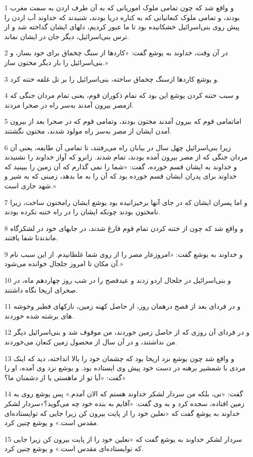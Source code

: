 \par 1 و واقع شد که چون تمامی ملوک اموریانی که به آن طرف اردن به سمت مغرب بودند، و تمامی ملوک کنعانیانی که به کناره دریا بودند، شنیدند که خداوند آب اردن را پیش روی بنی‌اسرائیل خشکانیده بود تا ما عبور کردیم، دلهای ایشان گداخته شد و از ترس بنی‌اسرائیل، دیگر جان در ایشان نماند.
\par 2 در آن وقت، خداوند به یوشع گفت: «کاردها از سنگ چخماق برای خود بساز، و بنی‌اسرائیل را بار دیگر مختون ساز.»
\par 3 و یوشع کاردها ازسنگ چخماق ساخته، بنی‌اسرائیل را بر تل غلفه ختنه کرد.
\par 4 و سبب ختنه کردن یوشع این بود که تمام ذکوران قوم، یعنی تمام مردان جنگی که ازمصر بیرون آمدند به‌سر راه در صحرا مردند.
\par 5 اماتمامی قوم که بیرون آمدند مختون بودند، وتمامی قوم که در صحرا بعد از بیرون آمدن ایشان از مصر به‌سر راه مولود شدند، مختون نگشتند.
\par 6 زیرا بنی‌اسرائیل چهل سال در بیابان راه می‌رفتند، تا تمامی آن طایفه، یعنی آن مردان جنگی که از مصر بیرون آمده بودند، تمام شدند. زانرو که آواز خداوند را نشنیدند و خداوند به ایشان قسم خورده، گفت: «شما را نمی گذارم که آن زمین را ببینید که خداوند برای پدران ایشان قسم خورده بود که آن را به ما بدهد، زمینی که به شیر و شهد جاری است.»
\par 7 و اما پسران ایشان که در جای آنها برخیزانیده بود یوشع ایشان رامختون ساخت، زیرا نامختون بودند چونکه ایشان را در راه ختنه نکرده بودند.
\par 8 و واقع شد که چون از ختنه کردن تمام قوم فارغ شدند، در جایهای خود در لشکرگاه ماندندتا شفا یافتند.
\par 9 و خداوند به یوشع گفت: «امروزعار مصر را از روی شما غلطانیدم. از این سبب نام آن مکان تا امروز جلجال خوانده می‌شود.»
\par 10 و بنی‌اسرائیل در جلجال اردو زدند و عیدفصح را در شب روز چهاردهم ماه، در صحرای اریحا نگاه داشتند.
\par 11 و در فردای بعد از فصح درهمان روز، از حاصل کهنه زمین، نازکهای فطیر وخوشه های برشته شده خوردند.
\par 12 و در فردای آن روزی که از حاصل زمین خوردند، من موقوف شد و بنی‌اسرائیل دیگر من نداشتند، و در آن سال از محصول زمین کنعان می‌خوردند.
\par 13 و واقع شد چون یوشع نزد اریحا بود که چشمان خود را بالا انداخته، دید که اینک مردی با شمشیر برهنه در دست خود پیش وی ایستاده بود. و یوشع نزد وی آمده، او را گفت: «آیا تو از ماهستی یا از دشمنان ما؟»
\par 14 گفت: «نی، بلکه من سردار لشکر خداوند هستم که الان آمدم.» پس یوشع روی به زمین افتاده، سجده کرد و به وی گفت: «آقایم به بنده خود چه می‌گوید؟»سردار لشکر خداوند به یوشع گفت که «نعلین خود را از پایت بیرون کن زیرا جایی که توایستاده‌ای مقدس است.» و یوشع چنین کرد.
\par 15 سردار لشکر خداوند به یوشع گفت که «نعلین خود را از پایت بیرون کن زیرا جایی که توایستاده‌ای مقدس است.» و یوشع چنین کرد.
 
